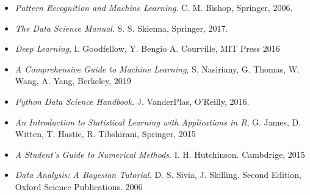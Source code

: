 \documentclass[letterpaper,10pt,onecolumn]{article}
\begin{document}
\begin{itemize}


\item
\textit{Pattern Recognition and Machine Learning}. C. M. Bishop, 
Springer, 2006.\\[-0.6cm]

\item 
\textit{The Data Science Manual}. S. S. Skienna, Springer, 2017.\\[-0.6cm]

\item
\textit{Deep Learning}, I. Goodfellow, Y. Bengio A. Courville, MIT Press 2016 \\[-0.6cm]

\item
\textit{A Comprehensive Guide to Machine Learning}, S. Nasiriany, G. Thomas, W. Wang, A. Yang, 
Berkeley, 2019 \\[-0.6cm]

\item
\textit{Python Data Science Handbook.} J. VanderPlas, O'Reilly, 2016.\\[-0.6cm]

\item 
\textit{An Introduction to Statistical Learning with Applications in
  R}, G. James, D. Witten, T. Hastie, R. Tibshirani, Springer, 2015 \\[-0.6cm]

\item 
\textit{A Student's Guide to Numerical  Methods}. I. H. Hutchinson. Cambdrige, 2015 \\[-0.6cm]

\item
\textit{Data Analysis: A Bayesian Tutorial.} D. S. Sivia,
J. Skilling. Second Edition, Oxford Science Publications. 2006 \\[-0.6cm]

\end{itemize}
\end{document}
